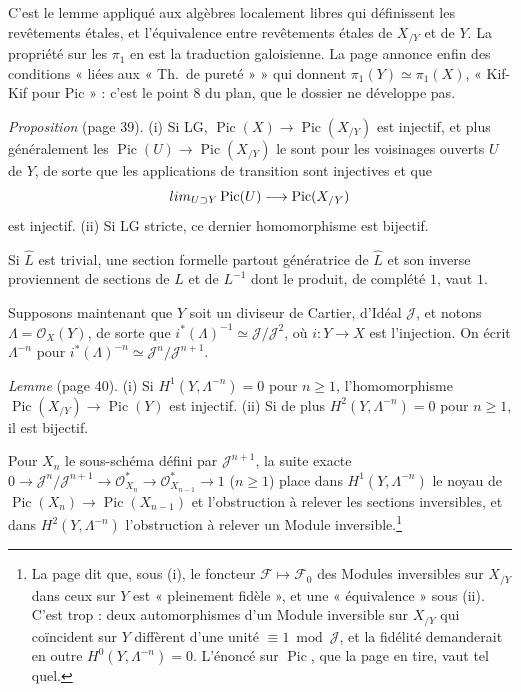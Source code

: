\documentclass[11pt,a4paper]{article}
\begin{document}
C'est le lemme appliqué aux algèbres localement libres qui définissent les
revêtements étales, et l'équivalence entre revêtements étales de $X_{/Y}$ et
de $Y$. La propriété sur les $\pi_1$ en est la traduction galoisienne. La page
annonce enfin des conditions « liées aux « Th.\ de pureté » » qui donnent
$\pi_1(Y) \simeq \pi_1(X)$, « Kif-Kif pour Pic » : c'est le point 8 du plan,
que le dossier ne développe pas.

\emph{Proposition} (page 39). (i) Si LG, $\operatorname{Pic}(X) \to
\operatorname{Pic}(X_{/Y})$ est injectif, et plus généralement les
$\operatorname{Pic}(U) \to \operatorname{Pic}(X_{/Y})$ le sont pour les
voisinages ouverts $U$ de $Y$, de sorte que les applications de transition
sont injectives et que
\[
  \varinjlim_{U \supset Y} \operatorname{Pic}(U) \longrightarrow \operatorname{Pic}(X_{/Y})
\]
est injectif. (ii) Si LG stricte, ce dernier homomorphisme est bijectif.

Si $\widehat{L}$ est trivial, une section formelle partout génératrice de
$\widehat{L}$ et son inverse proviennent de sections de $L$ et de
$L^{-1}$ dont le produit, de complété $1$, vaut $1$.

Supposons maintenant que $Y$ soit un diviseur de Cartier, d'Idéal
$\mathcal{J}$, et notons $\Lambda = \mathcal{O}_X(Y)$, de sorte que
$i^*(\Lambda)^{-1} \simeq \mathcal{J}/\mathcal{J}^2$, où $i\colon Y \to X$ est
l'injection. On écrit $\Lambda^{-n}$ pour $i^*(\Lambda)^{-n} \simeq
\mathcal{J}^n/\mathcal{J}^{n+1}$.

\emph{Lemme} (page 40). (i) Si $H^1(Y, \Lambda^{-n}) = 0$ pour $n \geq 1$,
l'homomorphisme $\operatorname{Pic}(X_{/Y}) \to \operatorname{Pic}(Y)$ est
injectif. (ii) Si de plus $H^2(Y, \Lambda^{-n}) = 0$ pour $n \geq 1$, il est
bijectif.

Pour $X_n$ le sous-schéma défini par $\mathcal{J}^{n+1}$, la suite exacte
$0 \to \mathcal{J}^n/\mathcal{J}^{n+1} \to \mathcal{O}_{X_n}^* \to
\mathcal{O}_{X_{n-1}}^* \to 1$ ($n \geq 1$) place dans
$H^1(Y, \Lambda^{-n})$ le noyau de $\operatorname{Pic}(X_n) \to
\operatorname{Pic}(X_{n-1})$ et l'obstruction à relever les sections
inversibles, et dans $H^2(Y, \Lambda^{-n})$ l'obstruction à relever un Module
inversible.\footnote{La page dit que, sous (i), le foncteur $\mathcal{F}
\mapsto \mathcal{F}_0$ des Modules inversibles sur $X_{/Y}$ dans ceux sur $Y$
est « pleinement fidèle », et une « équivalence » sous (ii). C'est trop :
deux automorphismes d'un Module inversible sur $X_{/Y}$ qui coïncident sur $Y$
diffèrent d'une unité $\equiv 1 \bmod \mathcal{J}$, et la fidélité demanderait
en outre $H^0(Y, \Lambda^{-n}) = 0$. L'énoncé sur
$\operatorname{Pic}$, que la page en tire, vaut tel quel.}
\end{document}
